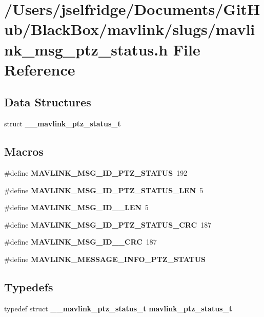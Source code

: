 \section{/\+Users/jselfridge/\+Documents/\+Git\+Hub/\+Black\+Box/mavlink/slugs/mavlink\+\_\+msg\+\_\+ptz\+\_\+status.h File Reference}
\label{mavlink__msg__ptz__status_8h}
\subsection*{Data Structures}
\begin{DoxyCompactItemize}
\item 
struct \textbf{ \+\_\+\+\_\+mavlink\+\_\+ptz\+\_\+status\+\_\+t}
\end{DoxyCompactItemize}
\subsection*{Macros}
\begin{DoxyCompactItemize}
\item 
\#define \textbf{ M\+A\+V\+L\+I\+N\+K\+\_\+\+M\+S\+G\+\_\+\+I\+D\+\_\+\+P\+T\+Z\+\_\+\+S\+T\+A\+T\+US}~192
\item 
\#define \textbf{ M\+A\+V\+L\+I\+N\+K\+\_\+\+M\+S\+G\+\_\+\+I\+D\+\_\+\+P\+T\+Z\+\_\+\+S\+T\+A\+T\+U\+S\+\_\+\+L\+EN}~5
\item 
\#define \textbf{ M\+A\+V\+L\+I\+N\+K\+\_\+\+M\+S\+G\+\_\+\+I\+D\+\_\+\_\+\+L\+EN}~5
\item 
\#define \textbf{ M\+A\+V\+L\+I\+N\+K\+\_\+\+M\+S\+G\+\_\+\+I\+D\+\_\+\+P\+T\+Z\+\_\+\+S\+T\+A\+T\+U\+S\+\_\+\+C\+RC}~187
\item 
\#define \textbf{ M\+A\+V\+L\+I\+N\+K\+\_\+\+M\+S\+G\+\_\+\+I\+D\+\_\+\_\+\+C\+RC}~187
\item 
\#define \textbf{ M\+A\+V\+L\+I\+N\+K\+\_\+\+M\+E\+S\+S\+A\+G\+E\+\_\+\+I\+N\+F\+O\+\_\+\+P\+T\+Z\+\_\+\+S\+T\+A\+T\+US}
\end{DoxyCompactItemize}
\subsection*{Typedefs}
\begin{DoxyCompactItemize}
\item 
typedef struct \textbf{ \+\_\+\+\_\+mavlink\+\_\+ptz\+\_\+status\+\_\+t} \textbf{ mavlink\+\_\+ptz\+\_\+status\+\_\+t}
\end{DoxyCompactItemize}


